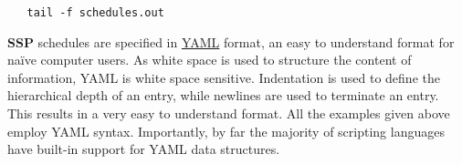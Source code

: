 \documentclass[12pt]{article}
\begin{document}
\begin{verbatim}
   tail -f schedules.out
\end{verbatim}
{\bf SSP} schedules are specified in \href{http://www.yaml.org/}{YAML} format, an easy to understand format for na\"{i}ve computer users. As white space is  used to structure the content of information, YAML is white space sensitive. Indentation is used to define the hierarchical depth of an entry, while newlines are used to terminate an entry. This results in a very easy to understand format. All the examples given above employ YAML syntax. Importantly, by far the majority of scripting languages have built-in support for YAML data structures. 
\end{document}
